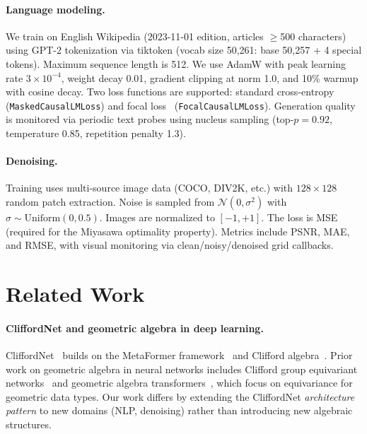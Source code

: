 \documentclass{article}
\begin{document}
\paragraph{Language modeling.}
We train on English Wikipedia (2023-11-01 edition, articles $\ge$500 characters) using GPT-2 tokenization via tiktoken (vocab size 50,261: base 50,257 + 4 special tokens).
Maximum sequence length is 512.
We use AdamW with peak learning rate $3 \times 10^{-4}$, weight decay 0.01, gradient clipping at norm 1.0, and 10\% warmup with cosine decay.
Two loss functions are supported: standard cross-entropy (\texttt{MaskedCausalLMLoss}) and focal loss~\citep{lin2017focal} (\texttt{FocalCausalLMLoss}).
Generation quality is monitored via periodic text probes using nucleus sampling (top-$p{=}0.92$, temperature 0.85, repetition penalty 1.3).

\paragraph{Denoising.}
Training uses multi-source image data (COCO, DIV2K, etc.) with $128 \times 128$ random patch extraction.
Noise is sampled from $\mathcal{N}(0, \sigma^2)$ with $\sigma \sim \text{Uniform}(0, 0.5)$.
Images are normalized to $[-1, +1]$.
The loss is MSE (required for the Miyasawa optimality property).
Metrics include PSNR, MAE, and RMSE, with visual monitoring via clean/noisy/denoised grid callbacks.

\section{Related Work}
\label{sec:related}

\paragraph{CliffordNet and geometric algebra in deep learning.}
CliffordNet~\citep{ji2026cliffordnet} builds on the MetaFormer framework~\citep{yu2022metaformer} and Clifford algebra~\citep{hestenes1984clifford,doran2003geometric}.
Prior work on geometric algebra in neural networks includes Clifford group equivariant networks~\citep{ruhe2023clifford} and geometric algebra transformers~\citep{brehmer2023geometric}, which focus on equivariance for geometric data types.
Our work differs by extending the CliffordNet \emph{architecture pattern} to new domains (NLP, denoising) rather than introducing new algebraic structures.
\end{document}
